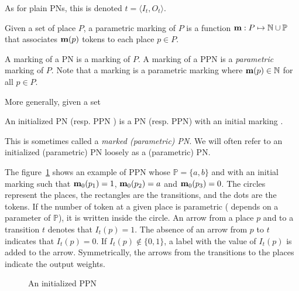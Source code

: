 As for plain \acp{PN}, this is denoted $t = \langle I_t, O_t \rangle$.

\begin{defi}
  Given a set of place $P$, a parametric marking of $P$ is a function $\mathbf{m} : P \mapsto \mathbb{N} \cup \mathbb{P} $ that associates $\mathbf{m}(p)$ tokens to each place $p \in P$.
\end{defi}

A marking of a \ac{PN} \NPT is a marking of $P$.
A marking of a \ac{PPN} \SPTP is a \emph{parametric} marking of $P$.
Note that a marking \mar is a parametric marking where $\mathbf{m}(p) \in \mathbb{N}$ for all $p \in P$.

More generally, given a set

\begin{defi}
  An initialized \ac{PN} \NPTm (resp. \ac{PPN} \SPTPm) is a \ac{PN} (resp. \ac{PPN}) with an initial marking \mari.
\end{defi}

This is sometimes called a \emph{marked (parametric) \ac{PN}}.
We will often refer to an initialized (parametric) \ac{PN} loosely as a (parametric) \ac{PN}.

The figure~\ref{fig:parametric-petri-net-example} shows an example of \ac{PPN} whose $\mathbb{P} = \{a, b\}$ and with an initial marking \mari such that $\mathbf{m}_0(p_1) = 1$, $\mathbf{m}_0(p_2) = a$ and $\mathbf{m}_0(p_3) = 0$. The circles represent the places, the rectangles are the transitions, and the dots are the tokens. If the number of token at a given place is parametric ( depends on a parameter of $\mathbb{P}$), it is written inside the circle. An arrow from a place $p$ and to a transition $t$ denotes that $I_t(p) = 1$. The absence of an arrow from $p$ to $t$ indicates that $I_t(p) = 0$. If $I_t(p) \notin \{0, 1\}$, a label with the value of $I_t(p)$ is added to the arrow.
Symmetrically, the arrows from the transitions to the places indicate the output weights.

\begin{figure}[h]
  \centering
  
  \par
  \caption{An initialized \ac{PPN}}
  \label{fig:parametric-petri-net-example}
\end{figure}

